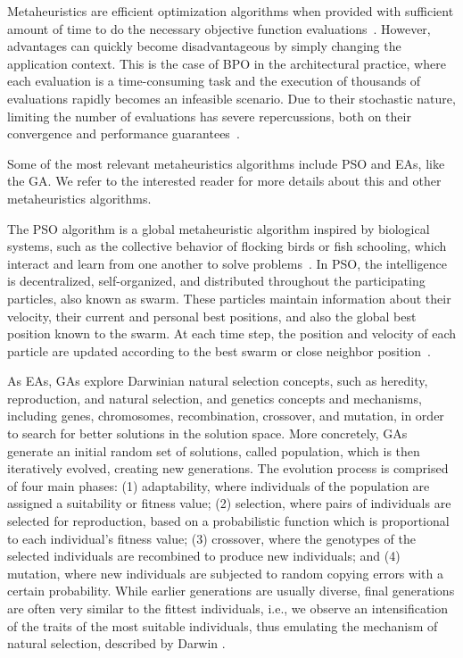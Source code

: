 	Metaheuristics are efficient optimization algorithms when provided with sufficient amount of time to do the necessary objective function evaluations~\cite{Conn2009}. However, advantages can quickly become disadvantageous by simply changing the application context. This is the case of \ac{BPO} in the architectural practice, where each evaluation is a time-consuming task and the execution of thousands of evaluations rapidly becomes an infeasible scenario. Due to their stochastic nature, limiting the number of evaluations has severe repercussions, both on their convergence and performance guarantees~\cite{Hasancebi2009}. 
	
	Some of the most relevant metaheuristics algorithms include \ac{PSO} and \acp{EA}, like the \ac{GA}. We refer  to the interested reader for more details about this and other metaheuristics algorithms.
	
	The \ac{PSO} algorithm is a global metaheuristic algorithm inspired by biological systems, such as the collective behavior of flocking birds or fish schooling, which interact and learn from one another to solve problems~\cite{Brownlee2011}. In \ac{PSO}, the intelligence is decentralized, self-organized, and distributed throughout the participating particles, also known as swarm. These particles maintain information about their velocity, their current and personal best positions, and also the global best position known to the swarm. At each time step, the position and velocity of each particle are updated according to the best swarm or close neighbor position~\cite{Brownlee2011}.
	
	As \acp{EA}, \acp{GA} explore Darwinian natural selection concepts, such as heredity, reproduction, and natural selection, and genetics concepts and mechanisms, including genes, chromosomes, recombination, crossover, and mutation, in order to search for better solutions in the solution space. More concretely, \acp{GA} generate an initial random set of solutions, called population, which is then iteratively evolved, creating new generations. The evolution process is comprised of four main phases: (1) adaptability, where individuals of the population are assigned a suitability or fitness value; (2) selection, where pairs of individuals are selected for reproduction, based on a probabilistic function which is proportional to each individual's fitness value; (3) crossover, where the genotypes of the selected individuals are recombined to produce new individuals; and (4) mutation, where new individuals are subjected to random copying errors with a certain probability. While earlier generations are usually diverse, final generations are often very similar to the fittest individuals, i.e., we observe an intensification of the traits of the most suitable individuals, thus emulating the mechanism of natural selection, described by Darwin \cite{Brownlee2011}. %
	
